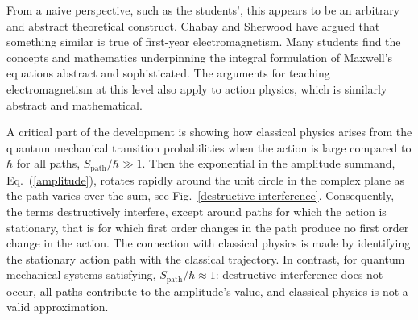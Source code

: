 \documentclass[prb,oncolumn]{revtex4-2}
\begin{document}
From a naive perspective, such as the students', this appears to be an arbitrary and abstract theoretical construct. Chabay and Sherwood have argued that something similar is true of first-year electromagnetism. \cite{ChabayEM} Many students find the concepts and mathematics underpinning the integral formulation of Maxwell's equations abstract and sophisticated. The arguments for teaching electromagnetism at this level also apply to action physics, which is similarly abstract and mathematical.

\newpage

A critical part of the development is showing how classical physics arises from the quantum mechanical transition probabilities when the action is large compared to $\hbar$ for all paths, $S_\textrm{path} / \hbar \gg 1$. Then the exponential in the amplitude summand, Eq.~(\ref{amplitude}), rotates rapidly around the unit circle in the complex plane as the path varies over the sum, see Fig.~\ref{destructive interference}. Consequently, the terms destructively interfere, except around paths for which the action is stationary, that is for which first order changes in the path produce no first order change in the action. \cite{TaylorCIP, Ogborn, QED} The connection with classical physics is made by identifying the stationary action path with the classical trajectory. In contrast, for quantum mechanical systems satisfying, $S_\textrm{path} / \hbar \approx 1$: destructive interference does not occur, all paths contribute to the amplitude's value, and classical physics is not a valid approximation.
\end{document}
